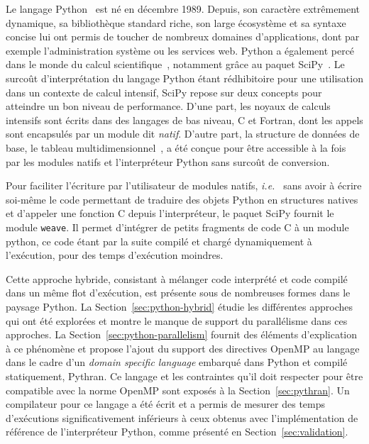 \documentclass[renpar]{compas2013}
\begin{document}
Le langage Python~\cite{rossum97} est né en décembre 1989. Depuis, son
caractère extrêmement dynamique, sa bibliothèque standard riche, son large
écosystème et sa syntaxe concise lui ont permis de toucher de nombreux
domaines d'applications, dont par exemple l'administration système ou les
services web.  Python a également percé dans le monde du calcul
scientifique~\cite{Oliphant2007}, notamment grâce au paquet
SciPy~\cite{scipy}. Le surcoût d'interprétation du langage Python étant
rédhibitoire pour une utilisation dans un contexte de calcul intensif,
SciPy repose sur deux concepts pour atteindre un bon niveau de
performance. D'une part, les noyaux de calculs intensifs sont écrits dans
des langages de bas niveau, C et Fortran, dont les appels sont encapsulés
par un module dit \emph{natif}. D'autre part, la structure de données de
base, le tableau multidimensionnel~\cite{numpyarray2011}, a été conçue pour
être accessible à la fois par les modules natifs et l'interpréteur Python
sans surcoût de conversion.

Pour faciliter l'écriture par l'utilisateur de modules natifs, \emph{i.e.\
} sans avoir à écrire soi-même le code permettant de traduire des objets
Python en structures natives et d'appeler une fonction C depuis
l'interpréteur, le paquet SciPy fournit le module \texttt{weave}. Il
permet d'intégrer de petits fragments de code C à un module python, ce
code étant par la suite compilé et chargé dynamiquement à l'exécution,
pour des temps d'exécution moindres.

Cette approche hybride, consistant à mélanger code interprété et code
compilé dans un même flot d'exécution, est présente sous de nombreuses
formes dans le paysage Python. La Section~\ref{sec:python-hybrid} étudie
les différentes approches qui ont été explorées et montre le manque de
support du parallélisme dans ces approches. La
Section~\ref{sec:python-parallelism} fournit des éléments d'explication à
ce phénomène et propose l'ajout du support des directives OpenMP au
langage dans le cadre d'un \emph{domain specific language} embarqué dans
Python et compilé statiquement, Pythran. Ce langage et les contraintes
qu'il doit respecter pour être compatible avec
la norme OpenMP sont exposés à la Section~\ref{sec:pythran}. Un
compilateur pour ce langage a été écrit et a permis de mesurer des temps
d'exécutions significativement inférieurs à ceux obtenus avec
l'implémentation de référence de l'interpréteur Python, comme présenté en
Section~\ref{sec:validation}.

\end{document}

